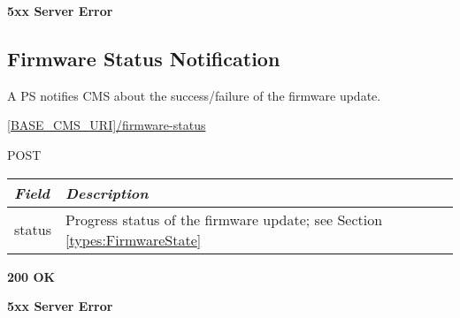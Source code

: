  \textbf{5xx Server Error}


\subsection{Firmware Status Notification}

A PS notifies CMS about the success/failure of the firmware update. 

 \url{[BASE_CMS_URI]/firmware-status}

 POST

\begin{tabularx}{\linewidth}{ | l | X | }
  \hline
  \textit{Field} & \textit{Description} \\
  \hline \hline
  	status			& Progress status of the firmware update; see Section \ref{types:FirmwareState} \\	
  \hline
\end{tabularx}

 \textbf{200 OK}

 \textbf{5xx Server Error}